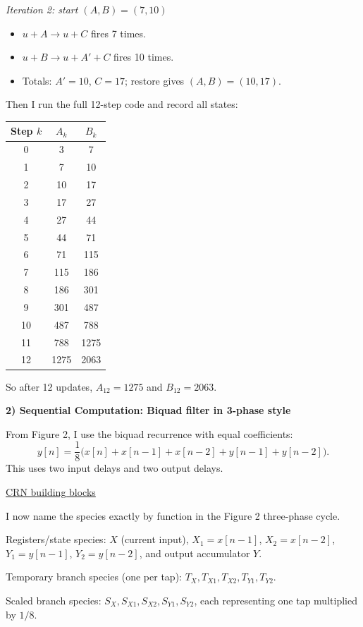 \documentclass[12pt]{article}
\begin{document}
\noindent\textit{Iteration 2: start $(A,B)=(7,10)$}
\begin{itemize}
\item $u + A \to u + C$ fires 7 times.
\item $u + B \to u + A' + C$ fires 10 times.
\item Totals: $A'=10$, $C=17$; restore gives $(A,B)=(10,17)$.
\end{itemize}

Then I run the full 12-step code and record all states:

\begin{center}
\begin{tabular}{c c c}
\hline
Step $k$ & $A_k$ & $B_k$ \\
\hline
0 & 3 & 7 \\
1 & 7 & 10 \\
2 & 10 & 17 \\
3 & 17 & 27 \\
4 & 27 & 44 \\
5 & 44 & 71 \\
6 & 71 & 115 \\
7 & 115 & 186 \\
8 & 186 & 301 \\
9 & 301 & 487 \\
10 & 487 & 788 \\
11 & 788 & 1275 \\
12 & 1275 & 2063 \\
\hline
\end{tabular}
\end{center}
So after 12 updates, $A_{12}=1275$ and $B_{12}=2063$.

\newpage
\noindent\textbf{2) Sequential Computation: Biquad filter in 3-phase style}

\medskip
From Figure 2, I use the biquad recurrence with equal coefficients:
\[
y[n] = \frac{1}{8}\Big(x[n] + x[n-1] + x[n-2] + y[n-1] + y[n-2]\Big).
\]
This uses two input delays and two output delays.

\medskip
\noindent\underline{CRN building blocks}

I now name the species exactly by function in the Figure 2 three-phase cycle.

Registers/state species: $X$ (current input), $X_1=x[n-1]$, $X_2=x[n-2]$, $Y_1=y[n-1]$, $Y_2=y[n-2]$, and output accumulator $Y$.

Temporary branch species (one per tap): $T_X,T_{X1},T_{X2},T_{Y1},T_{Y2}$.

Scaled branch species: $S_X,S_{X1},S_{X2},S_{Y1},S_{Y2}$, each representing one tap multiplied by $1/8$.
\end{document}
